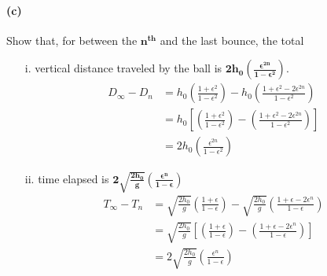 \documentclass[]{article}
\begin{document}
{		\paragraph{(c)} Show that, for between the $\bm{n^{th}}$ and the last bounce, the total
		\begin{enumerate}[label=\roman*,topsep=0pt]
			\item[i.] vertical distance traveled by the ball is  $\bm{ 2h_0 \left( \frac{\epsilon^{2n}}{1-\epsilon^2} \right) }$.
			\begin{equation*}
				\begin{split}
					D_{\infty} - D_n &= h_0 \left( \frac{1 + \epsilon^2}{1 - \epsilon^2} \right) - h_0 \left( \frac{1 + \epsilon^2 - 2\epsilon^{2n}}{1 - \epsilon^2} \right) \\
					&= h_0 \left[ \left( \frac{1 + \epsilon^2}{1 - \epsilon^2} \right) - \left( \frac{1 + \epsilon^2 - 2\epsilon^{2n}}{1 - \epsilon^2} \right) \right] \\
					&= 2h_0 \left( \frac{\epsilon^{2n}}{1-\epsilon^2} \right)
				\end{split}
			\end{equation*} 				
			\item[ii.] time elapsed is $\bm{ 2 \sqrt{\frac{2h_0}{g}} \left( \frac{\epsilon^{n}}{1-\epsilon} \right) }$
			\begin{equation*}
				\begin{split}
					T_{\infty} - T_n &= \sqrt{\frac{2h_0}{g}} \left( \frac{1 + \epsilon}{1 - \epsilon} \right) - \sqrt{\frac{2h_0}{g}} \left( \frac{1 + \epsilon - 2\epsilon^n}{1 - \epsilon} \right) \\
					&= \sqrt{\frac{2h_0}{g}} \left[ \left( \frac{1 + \epsilon}{1 - \epsilon} \right) - \left( \frac{1 + \epsilon - 2\epsilon^n}{1 - \epsilon} \right) \right] \\
					&= 2 \sqrt{\frac{2h_0}{g}} \left( \frac{\epsilon^{n}}{1-\epsilon} \right) \\
				\end{split}
			\end{equation*}
		\end{enumerate}
		
}
\end{document}
